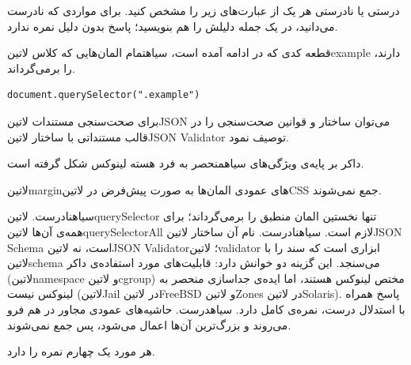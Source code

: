 
درستی یا نادرستی هر یک از عبارت‌های زیر را مشخص کنید.
برای مواردی که نادرست می‌دانید، در یک جمله دلیلش را هم بنویسید؛ پاسخ بدون دلیل نمره ندارد.


 قطعه کدی که در ادامه آمده است، ‌سیاه{تمام} المان‌هایی که کلاس ‌لاتین{example} دارند، را برمی‌گرداند.

\begin{latin}
\begin{verbatim}
document.querySelector(".example")
\end{verbatim}
\end{latin}

 برای صحت‌سنجی مستندات ‌لاتین{JSON} می‌توان ساختار و قوانین صحت‌سنجی را در قالب مستنداتی با ساختار ‌لاتین{JSON Validator} توصیف نمود.

 داکر بر پایه‌ی ویژگی‌های ‌سیاه{منحصر به فرد} هسته لینوکس شکل گرفته است.

 ‌لاتین{margin}های عمودی المان‌ها به صورت پیش‌فرض در ‌لاتین{CSS} جمع نمی‌شوند.




\begin{پاسخ}

 ‌سیاه{نادرست.} ‌لاتین{querySelector} تنها نخستین المان منطبق را برمی‌گرداند؛ برای همه‌ی آن‌ها ‌لاتین{querySelectorAll} لازم است.
 ‌سیاه{نادرست.} نام آن ساختار ‌لاتین{JSON Schema} است، نه ‌لاتین{JSON Validator}؛ ‌لاتین{validator} ابزاری است که سند را با ‌لاتین{schema} می‌سنجد.
 این گزینه دو خوانش دارد: قابلیت‌های مورد استفاده‌ی داکر (‌لاتین{namespace} و ‌لاتین{cgroup}) مختص لینوکس هستند، اما ایده‌ی جداسازی منحصر به لینوکس نیست (‌لاتین{Jail} در ‌لاتین{FreeBSD} و ‌لاتین{Zones} در ‌لاتین{Solaris}). پاسخ همراه با استدلال درست، نمره‌ی کامل دارد.
 ‌سیاه{درست.} حاشیه‌های عمودی مجاور در هم فرو می‌روند و بزرگ‌ترین آن‌ها اعمال می‌شود، پس جمع نمی‌شوند.

هر مورد یک چهارم نمره را دارد.

\end{پاسخ}
